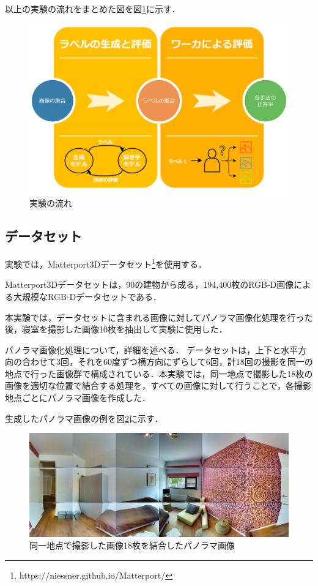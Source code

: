 \documentclass[a4paper,11pt]{jreport}
\begin{document}
以上の実験の流れをまとめた図を図\ref{fig:flow_example}に示す．

\begin{figure}[H]
  \centering
  \includegraphics[width=\linewidth]{figures/flow.png}
  \caption{実験の流れ}
  \label{fig:flow_example}
\end{figure}

\subsection{データセット}

実験では，Matterport3Dデータセット\footnote{https://niessner.github.io/Matterport/}を使用する．

Matterport3Dデータセットは，90の建物から成る，194,400枚のRGB-D画像による大規模なRGB-Dデータセットである．

本実験では，データセットに含まれる画像に対してパノラマ画像化処理を行った後，寝室を撮影した画像10枚を抽出して実験に使用した．

パノラマ画像化処理について，詳細を述べる．
データセットは，上下と水平方向の合わせて3回，それを60度ずつ横方向にずらして6回，計18回の撮影を同一の地点で行った画像群で構成されている．本実験では，同一地点で撮影した18枚の画像を適切な位置で結合する処理を，すべての画像に対して行うことで，各撮影地点ごとにパノラマ画像を作成した．

生成したパノラマ画像の例を図\ref{fig:panorama_example}に示す．

\begin{figure}[H]
  \centering
  \includegraphics[width=\linewidth]{figures/panorama.jpeg}
  \caption{同一地点で撮影した画像18枚を結合したパノラマ画像}
  \label{fig:panorama_example}
\end{figure}
\end{document}
